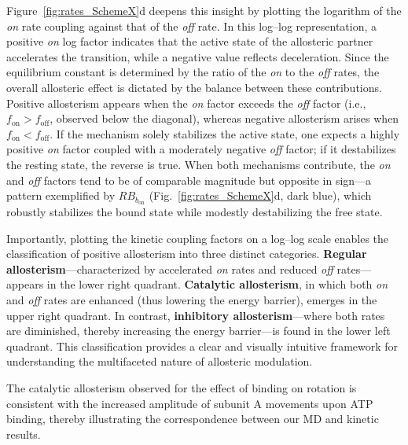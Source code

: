 \documentclass[pdflatex,sn-nature]{sn-jnl}%
\begin{document}
Figure~\ref{fig:rates_SchemeX}d deepens this insight by plotting the logarithm of the \textit{on} rate coupling against that of the \textit{off} rate. In this log–log representation, a positive \textit{on} log factor indicates that the active state of the allosteric partner accelerates the transition, while a negative value reflects deceleration. Since the equilibrium constant is determined by the ratio of the \textit{on} to the \textit{off} rates, the overall allosteric effect is dictated by the balance between these contributions. Positive allosterism appears when the \textit{on} factor exceeds the \textit{off} factor (i.e., $f_{\text{on}} > f_{\text{off}}$, observed below the diagonal), whereas negative allosterism arises when $f_{\text{on}} < f_{\text{off}}$. If the mechanism solely stabilizes the active state, one expects a highly positive \textit{on} factor coupled with a moderately negative \textit{off} factor; if it destabilizes the resting state, the reverse is true. When both mechanisms contribute, the \textit{on} and \textit{off} factors tend to be of comparable magnitude but opposite in sign---a pattern exemplified by $RB_{b_{\text{on}}}$ (Fig.~\ref{fig:rates_SchemeX}d, dark blue), which robustly stabilizes the bound state while modestly destabilizing the free state.

Importantly, plotting the kinetic coupling factors on a log–log scale enables the classification of positive allosterism into three distinct categories. \textbf{Regular allosterism}---characterized by accelerated \textit{on} rates and reduced \textit{off} rates---appears in the lower right quadrant. \textbf{Catalytic allosterism}, in which both \textit{on} and \textit{off} rates are enhanced (thus lowering the energy barrier), emerges in the upper right quadrant. In contrast, \textbf{inhibitory allosterism}---where both rates are diminished, thereby increasing the energy barrier---is found in the lower left quadrant. This classification provides a clear and visually intuitive framework for understanding the multifaceted nature of allosteric modulation.

The catalytic allosterism observed for the effect of binding on rotation is consistent with the increased amplitude of subunit A movements upon ATP binding, thereby illustrating the correspondence between our MD and kinetic results.
\end{document}
